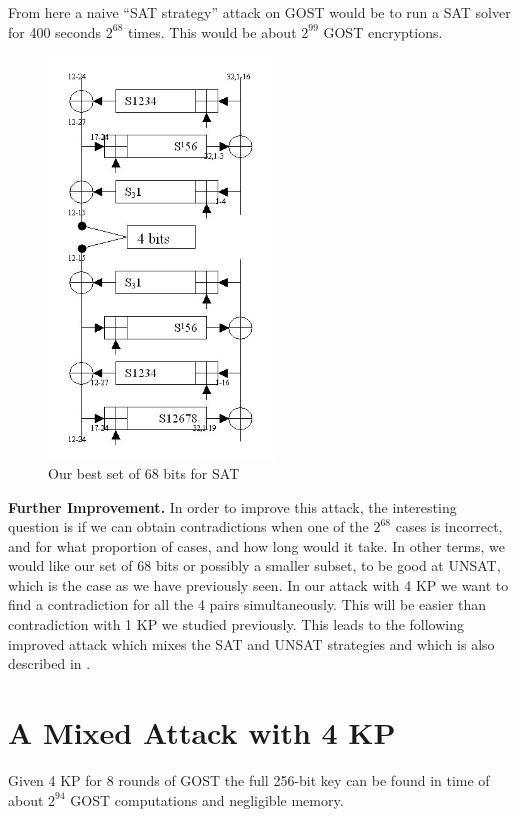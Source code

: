 From here a naive ``SAT strategy'' attack on GOST would be to run
a SAT solver for 400 seconds $2^{68}$ times.
This would be about $2^{99}$ GOST encryptions.


\begin{figure}[h]
	\centering
	\includegraphics[width=60mm]{./pics/gost81optimalSAT4KP.jpg}
	\caption{Our best set of 68 bits for SAT}
	\label{Gost81optimal4KPSAT68Bits}
\end{figure}

{\bf Further Improvement.}
In order to improve this attack,
the interesting question is if we
can obtain contradictions when one of the  $2^{68}$ cases is incorrect,
and for what proportion of cases, and how long would it take.
In other terms, we would like our set of 68 bits
or possibly a smaller subset, to be good at UNSAT, which is the case as we have
previously seen.
In our attack with 4 KP
we want to find a contradiction
for all the 4 pairs simultaneously.
This will be easier than contradiction with 1 KP
we studied previously.
This leads to the following improved attack
which mixes the SAT and UNSAT strategies
and which is also described in \cite{gostlow8r}.



\vskip-9pt
\vskip-9pt
\section{A Mixed Attack with 4 KP}
\label{section:Fact8R4KP_94_SATMethod}
\vskip-5pt

\begin{fact}
	\label{Fact8R4KP_94_SATMethod}
	Given 4 KP for 8 rounds of GOST
	the full 256-bit key can be found in
	time of about $2^{94}$
	GOST computations and negligible memory.
\end{fact}

